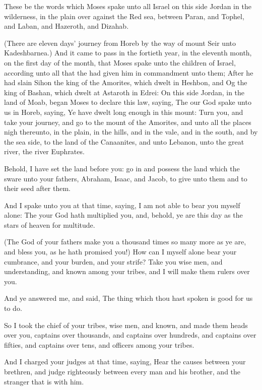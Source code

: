 \Chapter
\Verse These be the words which Moses spake unto all Israel on this side Jordan in the wilderness, in the plain over against the Red sea, between Paran, and Tophel, and Laban, and Hazeroth, and Dizahab.

\Verse (There are eleven days' journey from Horeb by the way of mount Seir unto Kadeshbarnea.)  \Verse And it came to pass in the fortieth year, in the eleventh month, on the first day of the month, that Moses spake unto the children of Israel, according unto all that the \LORD had given him in commandment unto them; \Verse After he had slain Sihon the king of the Amorites, which dwelt in Heshbon, and Og the king of Bashan, which dwelt at Astaroth in Edrei: \Verse On this side Jordan, in the land of Moab, began Moses to declare this law, saying, \Verse The \LORD our God spake unto us in Horeb, saying, Ye have dwelt long enough in this mount: \Verse Turn you, and take your journey, and go to the mount of the Amorites, and unto all the places nigh thereunto, in the plain, in the hills, and in the vale, and in the south, and by the sea side, to the land of the Canaanites, and unto Lebanon, unto the great river, the river Euphrates.

\Verse Behold, I have set the land before you: go in and possess the land which the \LORD sware unto your fathers, Abraham, Isaac, and Jacob, to give unto them and to their seed after them.

\Verse And I spake unto you at that time, saying, I am not able to bear you myself alone: \Verse The \LORD your God hath multiplied you, and, behold, ye are this day as the stars of heaven for multitude.

\Verse (The \LORD God of your fathers make you a thousand times so many more as ye are, and bless you, as he hath promised you!)  \Verse How can I myself alone bear your cumbrance, and your burden, and your strife?  \Verse Take you wise men, and understanding, and known among your tribes, and I will make them rulers over you.

\Verse And ye answered me, and said, The thing which thou hast spoken is good for us to do.

\Verse So I took the chief of your tribes, wise men, and known, and made them heads over you, captains over thousands, and captains over hundreds, and captains over fifties, and captains over tens, and officers among your tribes.

\Verse And I charged your judges at that time, saying, Hear the causes between your brethren, and judge righteously between every man and his brother, and the stranger that is with him.

